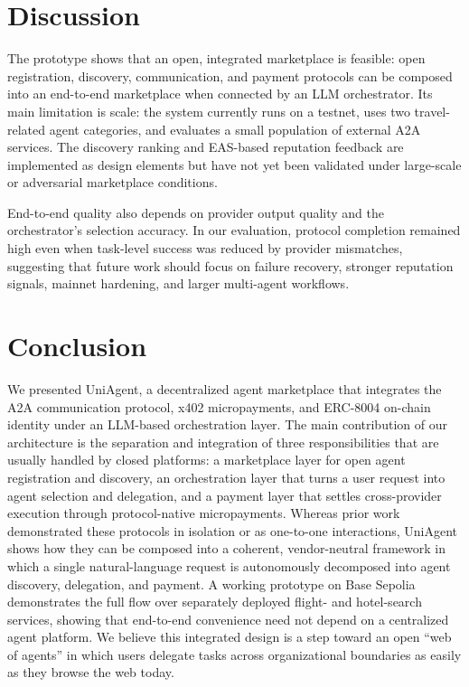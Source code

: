 \documentclass[sigconf]{acmart}
\begin{document}
\section{Discussion}
\label{sec:discussion}

The prototype shows that an open, integrated marketplace is feasible:
open registration, discovery, communication, and payment protocols can
be composed into an end-to-end marketplace when connected by an LLM
orchestrator. Its main limitation is scale: the system currently runs on
a testnet, uses two travel-related agent categories, and evaluates a
small population of external A2A services. The discovery ranking and
EAS-based reputation feedback are implemented as design elements but
have not yet been validated under large-scale or adversarial marketplace
conditions.

End-to-end quality also depends on provider output quality and the
orchestrator's selection accuracy. In our evaluation, protocol
completion remained high even when task-level success was reduced by
provider mismatches, suggesting that future work should focus on failure
recovery, stronger reputation signals, mainnet hardening, and larger
multi-agent workflows.

\section{Conclusion}
\label{sec:conclusion}

We presented UniAgent, a decentralized agent marketplace that integrates
the A2A communication protocol, x402 micropayments, and ERC-8004
on-chain identity under an LLM-based orchestration layer. The main
contribution of our architecture is the separation and integration of
three responsibilities that are usually handled by closed platforms: a
marketplace layer for open agent registration and discovery, an
orchestration layer that turns a user request into agent selection and
delegation, and a payment layer that settles cross-provider execution
through protocol-native micropayments. Whereas prior work demonstrated
these protocols in isolation or as one-to-one interactions, UniAgent
shows how they can be composed into a coherent, vendor-neutral framework
in which a single natural-language request is autonomously decomposed
into agent discovery, delegation, and payment. A working prototype on
Base Sepolia demonstrates the full flow over separately deployed flight-
and hotel-search services, showing that end-to-end convenience need not depend
on a centralized agent platform. We believe this integrated design is a
step toward an open ``web of agents'' in which users delegate tasks
across organizational boundaries as easily as they browse the web today.



\end{document}
